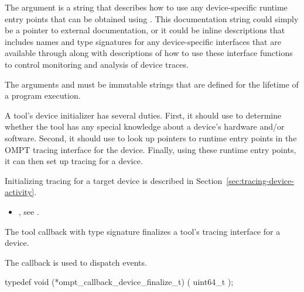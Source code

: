 \begin{itemize}
\begin{itemize}
The argument  is a string that describes
how to use any device-specific runtime
entry points that can be obtained using . This
documentation string could simply be a pointer to external
documentation, or it could be inline descriptions
that includes names and type signatures for any
device-specific interfaces that are available through 
along with descriptions of how to use these interface functions to
control monitoring and analysis of device traces.

\constraints
The arguments  and  must be
immutable strings that are defined for the lifetime of a program
execution.

\effect

A tool's device initializer has several duties.  First, it should use
 to determine whether the tool has any special knowledge
about a device's hardware and/or software.  Second, it should use
 to look up pointers to runtime entry points in the OMPT tracing
interface for the device.  Finally, using these runtime entry points, it can
then set up tracing for a device.

Initializing tracing for a target device is described in 
Section~\ref{sec:tracing-device-activity}.

\crossreferences
\begin{itemize}
\item {}, see
  .
\end{itemize}


\label{sec:ompt_callback_device_finalize_t}

\summary The tool callback with type signature
 finalizes a
tool's tracing interface for a device.

The  callback is used to dispatch
 events.

\format

\begin{ccppspecific}
\begin{omptCallback}
typedef void (*ompt_callback_device_finalize_t) (
  uint64_t 
);
\end{omptCallback}
\end{ccppspecific}


\argdesc


\end{itemize}
\end{itemize}
